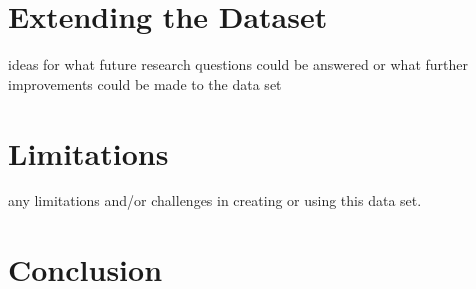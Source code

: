 \documentclass[10pt, conference]{IEEEtran}
\begin{document}
\section{Extending the Dataset}
ideas for what future research questions could be answered or what further improvements could be made to the data set

\section{Limitations}
any limitations and/or challenges in creating or using this data set.

\section{Conclusion}



\end{document}
